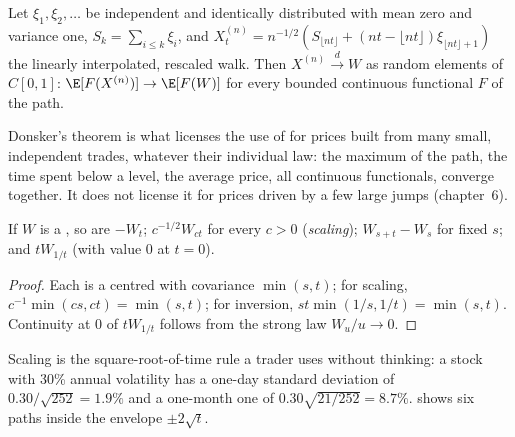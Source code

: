 \begin{theorem}\label{thm:qm:brownian-motion:donsker}
Let $\xi_1, \xi_2, \dots$ be independent and identically distributed with mean zero and
variance one, $S_k = \sum_{i \le k}\xi_i$, and $X^{(n)}_t = n^{-1/2}(S_{\lfloor nt\rfloor} +
(nt - \lfloor nt\rfloor)\xi_{\lfloor nt\rfloor + 1})$ the linearly interpolated, rescaled walk.
Then $X^{(n)} \xrightarrow{d} W$ as random elements of $C[0, 1]$: $\E[F(X^{(n)})] \to
\E[F(W)]$ for every bounded continuous functional $F$ of the path.
\end{theorem}

\admitted

Donsker's theorem is what licenses the use of  for prices built from many
small, independent trades, whatever their individual law: the maximum of the path, the time
spent below a level, the average price, all continuous functionals, converge together. It
does not license it for prices driven by a few large jumps (chapter~6).

\begin{proposition}[Invariances]\label{prop:qm:brownian-motion:scaling}
If $W$ is a , so are $-W_t$; $c^{-1/2}W_{ct}$ for every $c > 0$
(\emph{scaling}); $W_{s+t} - W_s$ for fixed $s$; and $tW_{1/t}$ (with value 0 at $t = 0$).
\end{proposition}

\begin{proof}
Each is a centred  with covariance $\min(s,t)$; for scaling, $c^{-1}\min(cs,
ct) = \min(s,t)$; for inversion, $st\min(1/s,1/t) = \min(s,t)$. Continuity at 0 of $tW_{1/t}$
follows from the strong law $W_u/u \to 0$.
\end{proof}

Scaling is the square-root-of-time rule a trader uses without thinking: a stock with 30\%
annual volatility has a one-day standard deviation of $0.30/\sqrt{252} = 1.9\%$ and a
one-month one of $0.30\sqrt{21/252} = 8.7\%$.  shows six
paths inside the envelope $\pm 2\sqrt t$.

